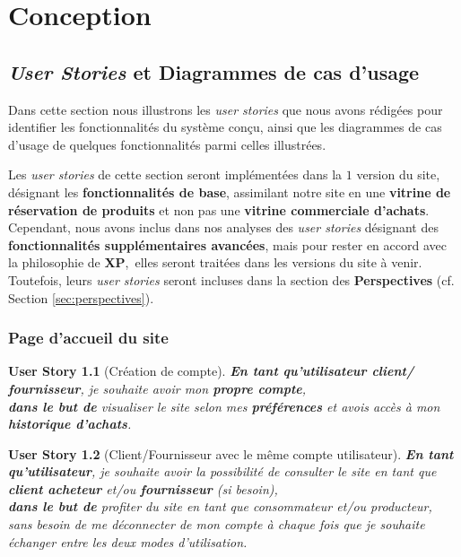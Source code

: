 \documentclass[a4paper,12pt]{book}
\theoremstyle{break}
\newtheorem*{userStory}{User Story}
\theoremstyle{break}
\theoremstyle{break}
\theoremstyle{break}
\theoremstyle{definition}
\theoremstyle{remark}
\begin{document}
\chapter{Conception}
\section{\textit{User Stories} et Diagrammes de cas d'usage}
Dans cette section nous illustrons les \textit{user stories} que nous avons rédigées pour identifier les fonctionnalités du système conçu, ainsi que les diagrammes de cas d'usage de quelques fonctionnalités parmi celles illustrées.

Les \textit{user stories} de cette section seront implémentées dans la $1$\iere{} version du site, désignant les \textbf{fonctionnalités de base}, assimilant notre site en une \textbf{vitrine de réservation de produits} et non pas une \textbf{vitrine commerciale d'achats}. Cependant, nous avons inclus dans nos analyses des \textit{user stories} désignant des \textbf{fonctionnalités supplémentaires avancées}, mais pour rester en accord avec la philosophie de \textbf{XP}, elles seront traitées dans les versions du site à venir. Toutefois, leurs \textit{user stories} seront incluses dans la section des \textbf{Perspectives} (cf. Section \ref{sec:perspectives}).

\subsection{Page d'accueil du site}
\begin{userStory}[Création de compte]
\textbf{En tant qu'utilisateur {\color{green}client}/{\color{red} fournisseur}}, je souhaite avoir mon \textbf{propre compte},\\
\indent
\textbf{dans le but de} visualiser le site selon mes \textbf{préférences} et avois accès à mon \textbf{historique d'achats}.
\end{userStory}

\begin{userStory}[Client/Fournisseur avec le même compte utilisateur]
\textbf{En tant qu'utilisateur}, je souhaite avoir la possibilité de consulter le site en tant que \textbf{{\color{green}client acheteur}} et/ou \textbf{{\color{red} fournisseur}} (\textit{si besoin}),\\
\indent
\textbf{dans le but de} profiter du site en tant que consommateur et/ou producteur, sans besoin de me déconnecter de mon compte à chaque fois que je souhaite échanger entre les deux modes d'utilisation.
\end{userStory}
\end{document}
